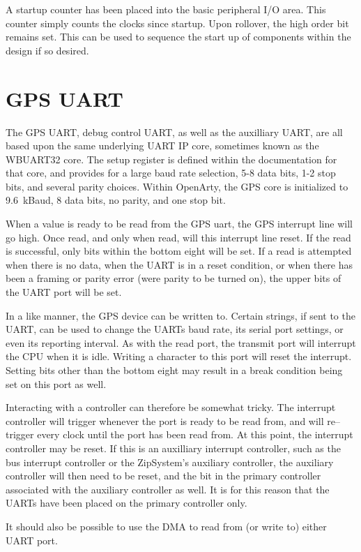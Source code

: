 \documentclass{gqtekspec}
\begin{document}
A startup counter has been placed into the basic peripheral I/O area.  This 
counter simply counts the clocks since startup.  Upon rollover, the high
order bit remains set.  This can be used to sequence the start up of components
within the design if so desired.

\section{GPS UART}
The GPS UART, debug control UART, as well as the auxilliary UART, are all
based upon the same underlying UART IP core, sometimes known as the WBUART32
core.  The setup register is defined within the documentation for that core,
and provides for a large baud rate selection, 5-8 data bits, 1-2 stop bits,
and several parity choices.  Within OpenArty, the GPS core is initialized
to 9.6~kBaud, 8 data bits, no parity, and one stop bit.  

When a value is ready to be read from the GPS uart, the GPS interrupt line
will go high.  Once read, and only when read, will this interrupt line reset.
If the read is successful, only bits within the bottom eight will be set.
If a read is attempted when there is no data, when the UART is in a reset
condition, or when there has been a framing or parity error (were parity
to be turned on), the upper bits of the UART port will be set.

In a like manner, the GPS device can be written to.  Certain strings, if sent
to the UART, can be used to change the UARTs baud rate, its serial port
settings, or even its reporting interval.  As with the read port, the transmit
port will interrupt the CPU when it is idle.  Writing a character to this
port will reset the interrupt.  Setting bits other than the bottom eight may
result in a break condition being set on this port as well.

Interacting with a controller can therefore be somewhat tricky.  The
interrupt controller will trigger whenever the port is ready to be read from,
and will re--trigger every clock until the port has been read from.  At this
point, the interrupt controller may be reset.  If this is an auxilliary
interrupt controller, such as the bus interrupt controller or the ZipSystem's
auxiliary controller, the auxiliary controller will then need to be reset,
and the bit in the primary controller associated with the auxiliary controller
as well.  It is for this reason that the UARTs have been placed on the
primary controller only.

It should also be possible to use the DMA to read from (or write to) either
UART port.
\end{document}
